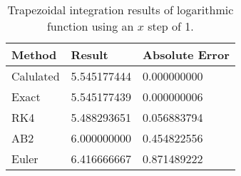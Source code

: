 \begin{singlespace}
\begin{table}[H]
	\centering
	\begin{tabular}{@{} l l l  @{}} 	
		\toprule %
		\footnotesize %
		\raggedright %
		Method	&		Result & Absolute Error		\\
		\midrule		
%
Calulated& 	5.545177444&	0.000000000\\
Exact& 	5.545177439&	0.000000006\\
RK4& 	5.488293651&	0.056883794\\
AB2& 	6.000000000&	0.454822556\\
Euler& 	6.416666667&	0.871489222\\
%
		\bottomrule
	\end{tabular}
	\caption{Trapezoidal integration results of logarithmic function using an $x$ step of 1.}
	\label{tab: trap log res}
\end{table}
\end{singlespace}
	
	